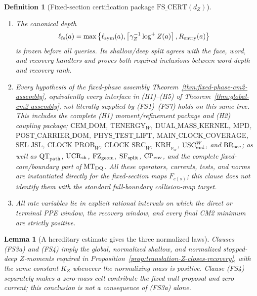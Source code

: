 \documentclass[11pt]{article}
\newtheorem{lemma}[theorem]{Lemma}
\newtheorem{definition}[theorem]{Definition}
\begin{document}
\begin{definition}[Fixed-section certification package
$\mathrm{FS\_CERT}(d_Z)$]
\begin{enumerate}[label=\textup{(FS\arabic*)}]
\item The canonical depth
\begin{equation}
 \ell_{\rm fs}(a)=\max\left\{\ell_{\rm sym}(a),
 \left\lceil\gamma_Z^{-1}\log^+Z(a)\right\rceil,
 R_{\rm entry}(a)\right\}
\label{eq:fixed-section-canonical-depth}
\end{equation}
is frozen before all queries.  Its shallow/deep split agrees with the face,
word, and recovery handlers and proves both required inclusions between
word-depth and recovery rank.
\item \begin{flushleft}Every hypothesis of the fixed-phase assembly
Theorem~\ref{thm:fixed-phase-cm2-assembly}, equivalently every interface in
\textup{(H1)--(H5)} of Theorem~\ref{thm:global-cm2-assembly}, not
literally supplied by \textup{(FS1)--(FS7)} holds on this same tree.  This
includes the complete \textup{(H1)} moment/refinement package and
\textup{(H2)} coupling package; $\mathrm{CEM\_DOM}$,
$\mathrm{TENERGY}_{W}$, $\mathrm{DUAL\_MASS\_KERNEL}$, $\mathrm{MPD}$,
$\mathrm{POST\_CARRIER\_DOM}$, $\mathrm{PHYS\_TEST\_LIFT}$,
$\mathrm{MAIN\_CLOCK\_COVERAGE}$, $\mathrm{SEL\_JSL}$,
$\mathrm{CLOCK\_PROB}_{W}$, $\mathrm{CLOCK\_SRC}_{W}$,
$\mathrm{KRH}_{p_W}$, $\mathrm{USC}_{\rm end}^{W}$, and
$\mathrm{BR}_{\rm sec}$; as well as $\mathrm{QT}_{\rm path}$,
$\mathrm{UCR}_{\rm sh}$, $\mathrm{FZ}_{\rm geom}$,
$\mathrm{SF}_{\rm split}$, $\mathrm{CP}_{\rm env}$, and the complete
fixed-core/boundary part of $\mathrm{MT}_{\rm DQ}$.
All these operators, currents, tests, and norms are instantiated directly for
the fixed-section maps $F_{c(s)}$; this clause does not identify them with the
standard full-boundary collision-map target.
\end{flushleft}
\item All rate variables lie in explicit rational intervals on which the
direct or terminal PPE window, the recovery window, and every final CM2
minimum are strictly positive.
\end{enumerate}
\end{definition}

\begin{lemma}[A hereditary estimate gives the three normalized laws]
\label{lem:fixed-section-hereditary-Z}
Clauses \textup{(FS3a)} and \textup{(FS4)} imply the global, normalized
shallow, and normalized stopped-deep $Z$-moments required in
Proposition~\ref{prop:translation-Z-closes-recovery}, with the same constant
$K_Z$ whenever the normalizing mass is positive.  Clause \textup{(FS4)}
separately makes a zero-mass cell contribute the fixed null proposal and zero
current; this conclusion is not a consequence of \textup{(FS3a)} alone.
\end{lemma}
\end{document}
